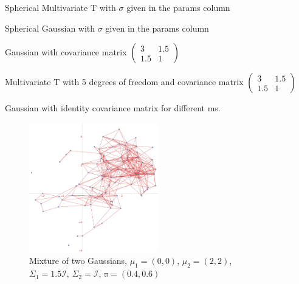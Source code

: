 \documentclass[12pt]{report}
\newcommand{\mc}[1]{\mathcal{#1}}
\newcommand{\mb}[1]{\mathbb{#1}}
\begin{document}
\centering
\begin{table}
    \centering
    \tiny
    \caption{Spherical Multivariate T with $\sigma$ given in the params column}
\end{table}

\begin{table}
    \centering
    \tiny
    \caption{Spherical Gaussian with $\sigma$ given in the params column}
\end{table}

\centering
\begin{table}
    \centering
    \tiny
    \caption[Gaussian with non-diagonal covariance matrix]{Gaussian with covariance matrix $\begin{pmatrix} 3 & 1.5 \\ 1.5 & 1 \end{pmatrix}$ }
\end{table}

\centering
\begin{table}
    \centering
    \tiny
    \caption[Multivariate T with non-diagonal covariance matrix]{Multivariate T with 5 degrees of freedom and covariance matrix $\begin{pmatrix} 3 & 1.5 \\ 1.5 & 1 \end{pmatrix}$ }
\end{table}

\centering
\begin{table}
    \centering
    \tiny
    \caption[Multiple ms]{Gaussian with identity covariance matrix for different ms.}
\end{table}

\begin{figure}
    \centering
    \includegraphics[width = 0.5\textwidth]{gaussian_mixtures.jpg}
    \caption{Mixture of two Gaussians, $\mu_1 = (0, 0),\, \mu_2 = (2, 2)$, $\Sigma_1 = 1.5\mc{I},\, \Sigma_2 = \mc{I}$, $\mb{\pi} = (0.4, 0.6)$}
\end{figure}
\end{document}
